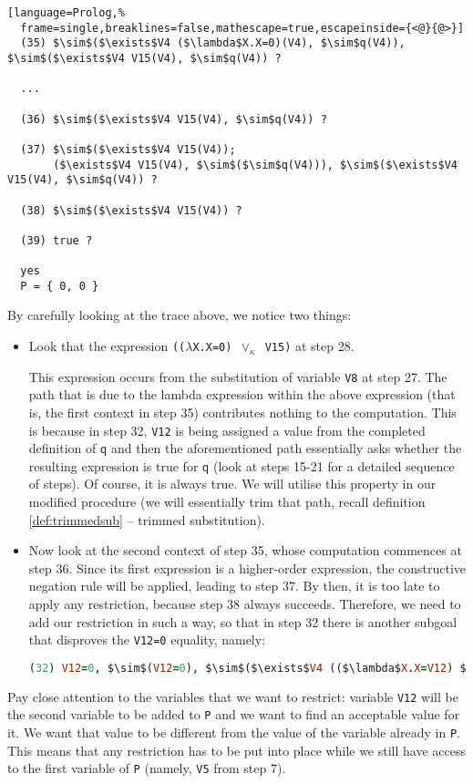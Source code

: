 \documentclass[inscr,ack,preface]{dithesis}
\theoremstyle{definition}
\newcommand{\msf}[1]{$\mathsf{#1}$}
\begin{document}
\begin{lstlisting}[language=Prolog,%
  frame=single,breaklines=false,mathescape=true,escapeinside={<@}{@>}]
  (35) $\sim$($\exists$V4 ($\lambda$X.X=0)(V4), $\sim$q(V4)), $\sim$($\exists$V4 V15(V4), $\sim$q(V4)) ?

  ...

  (36) $\sim$($\exists$V4 V15(V4), $\sim$q(V4)) ?

  (37) $\sim$($\exists$V4 V15(V4));
       ($\exists$V4 V15(V4), $\sim$($\sim$q(V4))), $\sim$($\exists$V4 V15(V4), $\sim$q(V4)) ?

  (38) $\sim$($\exists$V4 V15(V4)) ?

  (39) true ?

  yes
  P = { 0, 0 }
\end{lstlisting}

By carefully looking at the trace above, we notice two things:
\begin{itemize}
  \item Look that the expression \texttt{(($\lambda$X.X=0) $\vee_{\kappa}$ V15)} at step 28.

  This expression occurs from the substitution of variable \texttt{V8} at step 27. The path that is due to the lambda expression within the above expression (that is, the first context in step 35) contributes nothing to the computation. This is because in step 32, \texttt{V12} is being assigned a value from the completed definition of \msf{q} and then the aforementioned path essentially asks whether the resulting expression is true for \msf{q} (look at steps 15-21 for a detailed sequence of steps). Of course, it is always true. We will utilise this property in our modified procedure (we will essentially trim that path, recall definition \ref{def:trimmedsub} -- trimmed substitution).
  \item Now look at the second context of step 35, whose computation commences at step 36. Since its first expression is a higher-order expression, the constructive negation rule will be applied, leading to step 37. By then, it is too late to apply any restriction, because step 38 always succeeds. Therefore, we need to add our restriction in such a way, so that in step 32 there is another subgoal that disproves the \texttt{V12=0} equality, namely:
  \begin{lstlisting}[language=Prolog,%
    frame=single,breaklines=false,mathescape=true]
  (32) V12=0, $\sim$(V12=0), $\sim$($\exists$V4 (($\lambda$X.X=V12) $\vee_{\kappa}$ V15)(V4), $\sim$q(V4)) ?
  \end{lstlisting}
\end{itemize}

Pay close attention to the variables that we want to restrict: variable \texttt{V12} will be the second variable to be added to \texttt{P} and we want to find an acceptable value for it. We want that value to be different from the value of the variable already in \texttt{P}. This means that any restriction has to be put into place while we still have access to the first variable of \texttt{P} (namely, \texttt{V5} from step 7).
\end{document}
